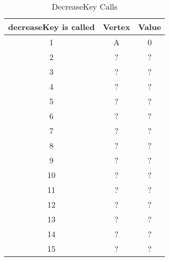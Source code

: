 \documentclass[10pt]{article}
\begin{document}
\begin{table}[h]
    \centering
    \begin{tabular}{|c|c|c|}
        \hline
        \textbf{decreaseKey is called} & \textbf{Vertex} & \textbf{Value} \\
        \hline
        1 & A & 0 \\
        2 & ? & ? \\ %
        3 & ? & ? \\
        4 & ? & ? \\
        5 & ? & ? \\
        6 & ? & ? \\
        7 & ? & ? \\
        8 & ? & ? \\
        9 & ? & ? \\
        10 & ? & ? \\
        11 & ? & ? \\
        12 & ? & ? \\
        13 & ? & ? \\
        14 & ? & ? \\
        15 & ? & ? \\ %
        \hline
    \end{tabular}
    \caption{DecreaseKey Calls}
    \label{tab:decreaseKey}
\end{table}


\end{document}
